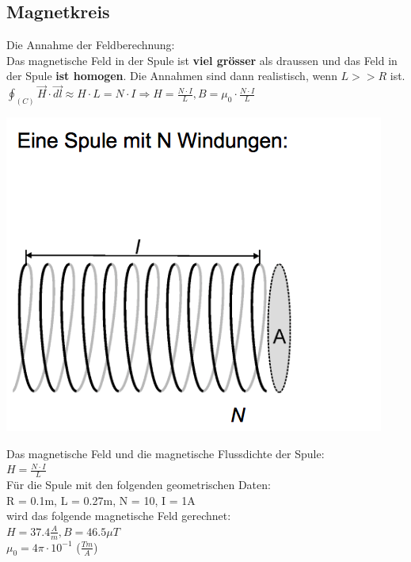 \subsection{Magnetkreis}

Die Annahme der Feldberechnung: \\
Das magnetische Feld in der Spule ist \textbf{viel grösser} als draussen und das Feld in der Spule \textbf{ist homogen}. Die Annahmen sind dann realistisch, wenn $L >> R$ ist.\\

$\oint_{(C)} \vec{H} \cdot \vec{dl} \approx H \cdot L = N \cdot I \Rightarrow H = \frac{N \cdot I}{L}, B = \mu_0 \cdot \frac{N \cdot I}{L}$

\begin{minipage}{0.5 \linewidth}
\includegraphics[width = \linewidth]{./Pics/VL2/spule}
\end{minipage}
\begin{minipage}{0.5 \linewidth}
Das magnetische Feld und die magnetische Flussdichte der Spule: \\

$H = \frac{N \cdot I}{L}$ \\

Für die Spule mit den folgenden geometrischen Daten: \\

R = 0.1m, L = 0.27m, N = 10, I = 1A \\

wird das folgende magnetische Feld gerechnet: \\

$H = 37.4 \frac{A}{m}, B = 46.5 \mu T $\\

$\mu_0 = 4 \pi \cdot 10^{-1}$ ($\frac{Tm}{A}$)
\end{minipage}

